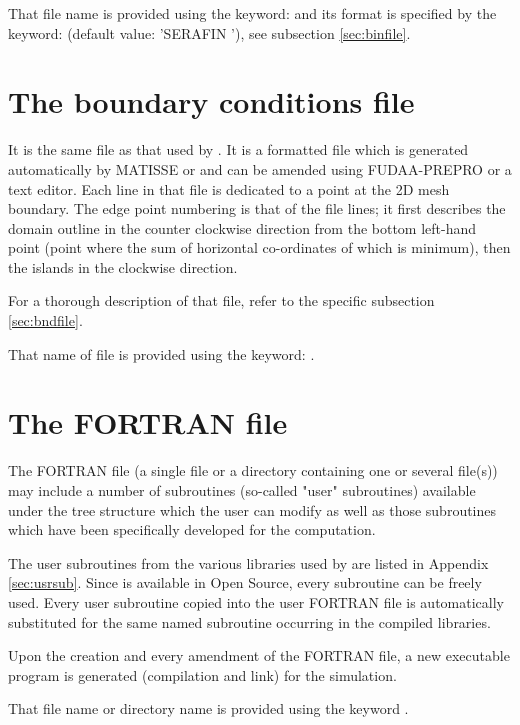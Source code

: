 That file name is provided using the keyword:  and its
format is specified by the keyword:  (default
value: 'SERAFIN '), see subsection \ref{sec:binfile}.


\section{The boundary conditions file}

It is the same file as that used by . It is a formatted file which is
generated automatically by MATISSE or \stbtel and can be amended
using FUDAA-PREPRO or a text editor. Each line in that file is
dedicated to a point at the 2D mesh boundary. The edge point numbering is that
of the file lines; it first describes the domain outline in the counter
clockwise direction from the bottom left-hand point (point where the sum of
horizontal co-ordinates of which is minimum), then the islands in the clockwise
direction.

For a thorough description of that file, refer to the specific subsection
\ref{sec:bndfile}.

That name of file is provided using the keyword: .


\section{The FORTRAN file}

The FORTRAN file (a single file or a directory containing one or several file(s))
may include a number of subroutines (so-called "user"
subroutines) available under the  tree structure which the user can
modify as well as those subroutines which have been specifically developed for
the computation.

The user subroutines from the various libraries used by  are listed
in Appendix \ref{sec:usrsub}. Since  is available in Open Source, every
subroutine can be freely used. Every user subroutine copied into the user
FORTRAN file is automatically substituted for the same named subroutine
occurring in the  compiled libraries.

Upon the creation and every amendment of the FORTRAN file, a new executable
program is generated (compilation and link) for the simulation.

That file name or directory name is provided using the keyword
.


